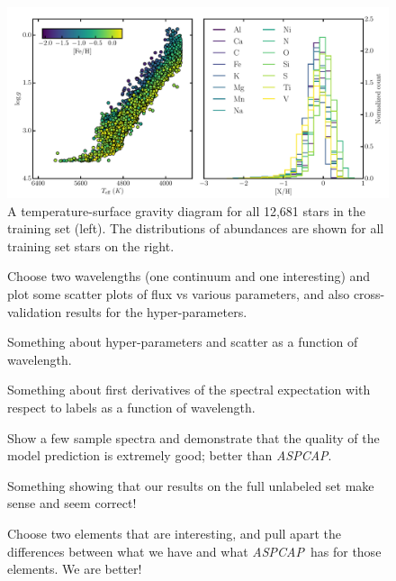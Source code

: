 \documentclass[12pt,preprint]{aastex}
\newcommand{\project}[1]{\textsl{#1}}
\newcommand{\acronym}[1]{{\small{#1}}}
\newcommand{\aspcap}{\project{\acronym{ASPCAP}}}
\begin{document}
\begin{figure}[p]
\includegraphics[width=\textwidth]{training_set_hrd.pdf}
\caption{A temperature-surface gravity diagram for all 12,681 stars in
the training set (left).  The distributions of abundances are shown for
all training set stars on the right.\label{fig:training_hrd}}
\end{figure}


\begin{figure}[p]
\caption{Choose two wavelengths (one continuum and one interesting)
  and plot some scatter plots of flux vs various parameters, and also
  cross-validation results for the
  hyper-parameters.\label{fig:onewavelength}}
\end{figure}

\begin{figure}[p]
\caption{Something about hyper-parameters and scatter as a function of
  wavelength.\label{fig:hyperpars}}
\end{figure}

\begin{figure}[p]
\caption{Something about first derivatives of the spectral expectation
  with respect to labels as a function of
  wavelength.\label{fig:derivatives}}
\end{figure}

\begin{figure}[p]
\caption{Show a few sample spectra and demonstrate that the quality of
  the model prediction is extremely good; better than
  \aspcap.\label{fig:correctness}}
\end{figure}

\begin{figure}[p]
\caption{Something showing that our results on the full unlabeled set
  make sense and seem correct!\label{fig:fulltest}}
\end{figure}

\begin{figure}[p]
\caption{Choose two elements that are interesting, and pull apart the
  differences between what we have and what \aspcap\ has for those
  elements.  We are better!\label{fig:elements}}
\end{figure}
\end{document}
